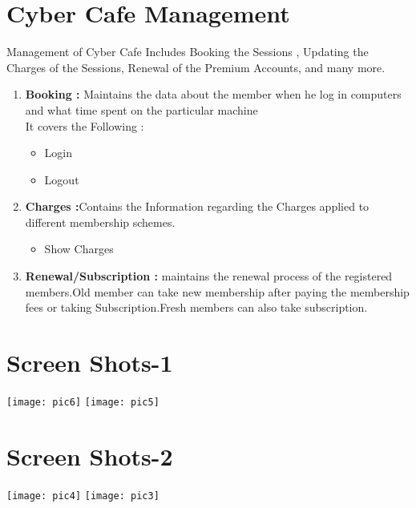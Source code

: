\documentclass[12pt]{article}
\begin{document}
  
     
    
\newpage
\section{Cyber Cafe Management}
\vspace{2.5cm}
Management of Cyber Cafe Includes Booking the Sessions , Updating the Charges of the Sessions, Renewal of the Premium Accounts, and many more.
\begin{enumerate}
    \item \textbf{Booking :} Maintains the data about the member when he log in computers and what time spent on the particular machine\\
    It covers the Following :
    \begin{itemize}
        \item Login
        \item Logout
    \end{itemize}
    \vspace{1cm}
    \item \textbf{Charges :}Contains the Information regarding the Charges applied to different membership schemes.
    \begin{itemize}
    \item Show Charges
    \end{itemize}
    \vspace{1cm}
    \item \textbf{Renewal/Subscription : } maintains the renewal process of the registered members.Old member can take new membership after paying the membership fees or taking Subscription.Fresh members can also take subscription.
\end{enumerate}

\newpage
\section{Screen Shots-1}
\vspace{2cm}
\texttt{[image: pic6]}
\texttt{[image: pic5]}

\newpage
\section{Screen Shots-2}
\vspace{2cm}

\texttt{[image: pic4]}
\texttt{[image: pic3]}

\newpage
\end{document}
